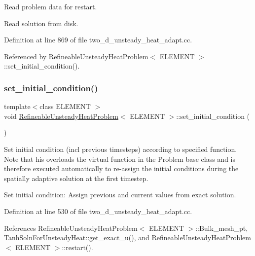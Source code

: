 Read problem data for restart. 

Read solution from disk. 

Definition at line 869 of file two\+\_\+d\+\_\+unsteady\+\_\+heat\+\_\+adapt.\+cc.



Referenced by Refineable\+Unsteady\+Heat\+Problem$<$ E\+L\+E\+M\+E\+N\+T $>$\+::set\+\_\+initial\+\_\+condition().

\mbox{\label{classRefineableUnsteadyHeatProblem_a30e2e1d62b059982f7014b74f4fe2be9}} 
\subsubsection{\texorpdfstring{set\+\_\+initial\+\_\+condition()}{set\_initial\_condition()}}
{\footnotesize\ttfamily template$<$class E\+L\+E\+M\+E\+NT $>$ \\
void \hyperlink{classRefineableUnsteadyHeatProblem}{Refineable\+Unsteady\+Heat\+Problem}$<$ E\+L\+E\+M\+E\+NT $>$\+::set\+\_\+initial\+\_\+condition (\begin{DoxyParamCaption}{ }\end{DoxyParamCaption})}



Set initial condition (incl previous timesteps) according to specified function. Note that his overloads the virtual function in the Problem base class and is therefore executed automatically to re-\/assign the initial conditions during the spatially adaptive solution at the first timestep. 

Set initial condition\+: Assign previous and current values from exact solution. 

Definition at line 530 of file two\+\_\+d\+\_\+unsteady\+\_\+heat\+\_\+adapt.\+cc.



References Refineable\+Unsteady\+Heat\+Problem$<$ E\+L\+E\+M\+E\+N\+T $>$\+::\+Bulk\+\_\+mesh\+\_\+pt, Tanh\+Soln\+For\+Unsteady\+Heat\+::get\+\_\+exact\+\_\+u(), and Refineable\+Unsteady\+Heat\+Problem$<$ E\+L\+E\+M\+E\+N\+T $>$\+::restart().




